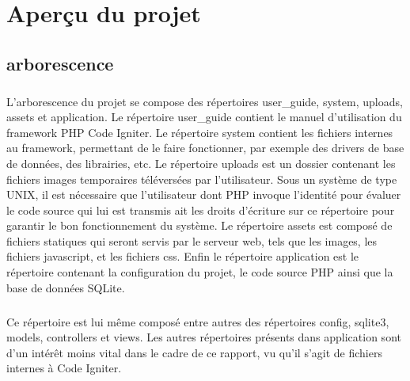 \chapter{Aperçu du projet}
\section{arborescence}
    \paragraph{}
        L'arborescence du projet se compose des répertoires user\_guide, system,
        uploads, assets et application.
        Le répertoire user\_guide contient le manuel d'utilisation du framework
        PHP Code Igniter.
        Le répertoire system contient les fichiers internes au framework,
        permettant de le faire fonctionner, par exemple des drivers de base
        de données, des librairies, etc.
        Le répertoire uploads est un dossier contenant les fichiers images
        temporaires téléversées par l'utilisateur.
        Sous un système de type UNIX, il est nécessaire que l'utilisateur dont
        PHP invoque l'identité pour évaluer le code source qui lui est
        transmis ait les droits d'écriture sur ce répertoire pour garantir le
        bon fonctionnement du système.
        Le répertoire assets est composé de fichiers statiques qui seront 
        servis par le serveur web, tels que les images, les fichiers javascript,
        et les fichiers css.
        Enfin le répertoire application est le répertoire contenant la
        configuration du projet, le code source PHP ainsi que la base de
        données SQLite.

    \paragraph{}
        Ce répertoire est lui même composé entre autres des répertoires 
        config, sqlite3, models, controllers et views.
        Les autres répertoires présents dans application sont d'un intérêt moins
        vital dans le cadre de ce rapport, vu qu'il s'agit de fichiers internes
        à Code Igniter.

